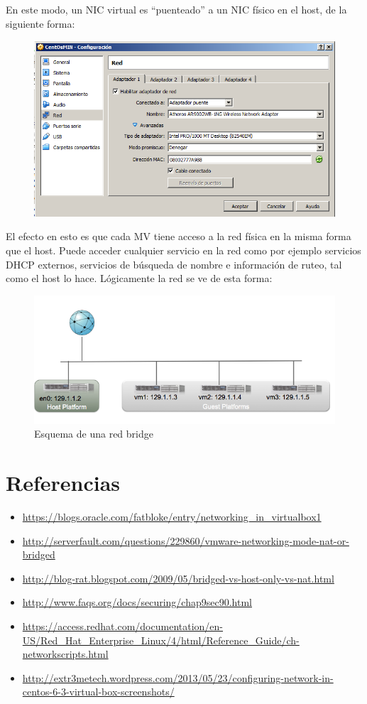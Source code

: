 \documentclass[11pt]{article}
\begin{document}
	En este modo, un NIC virtual es ``puenteado'' a un NIC físico en el host, de la siguiente forma:

	\begin{figure}[ht]
	\center
	\includegraphics[width=0.5\linewidth]{screenshots/MIN/bridge/bridge-mv-min.png}
	\end{figure}

	El efecto en esto es que cada MV tiene acceso a la red física en la misma forma que el host. Puede acceder cualquier servicio en la red como por ejemplo servicios DHCP externos, servicios de búsqueda de nombre e información de ruteo, tal como el host lo hace. Lógicamente la red se ve de esta forma:

	\begin{figure}[ht]
	\center
	\includegraphics[width=0.75\linewidth]{screenshots/bridge-network.png} 
	\caption{Esquema de una red bridge} 
	\end{figure}


\section{Referencias}
	\begin{itemize}
		\item \url{https://blogs.oracle.com/fatbloke/entry/networking_in_virtualbox1}
		\item \url{http://serverfault.com/questions/229860/vmware-networking-mode-nat-or-bridged}
		\item \url{http://blog-rat.blogspot.com/2009/05/bridged-vs-host-only-vs-nat.html}
		\item \url{http://www.faqs.org/docs/securing/chap9sec90.html}
		\item \scriptsize \url{https://access.redhat.com/documentation/en-US/Red_Hat_Enterprise_Linux/4/html/Reference_Guide/ch-networkscripts.html}
		\item \scriptsize \url{http://extr3metech.wordpress.com/2013/05/23/configuring-network-in-centos-6-3-virtual-box-screenshots/}
	\end{itemize}
\end{document}
